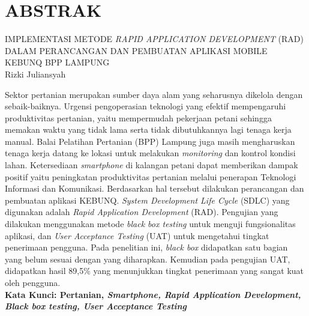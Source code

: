 
\chapter*{ABSTRAK}
\noindent IMPLEMENTASI METODE \textit{RAPID APPLICATION DEVELOPMENT} (RAD) DALAM PERANCANGAN DAN PEMBUATAN APLIKASI MOBILE KEBUNQ BPP LAMPUNG\\
Rizki Juliansyah

\begin{singlespace}
    \begin{justify}
        
    Sektor pertanian merupakan sumber daya alam yang seharusnya dikelola dengan sebaik-baiknya. Urgensi pengoperasian teknologi yang efektif mempengaruhi produktivitas 
    pertanian, yaitu mempermudah pekerjaan petani sehingga memakan waktu yang tidak lama serta tidak dibutuhkannya lagi tenaga kerja manual.
    Balai Pelatihan Pertanian (BPP) Lampung juga masih mengharuskan tenaga kerja datang ke lokasi untuk melakukan \textit{monitoring} 
    dan kontrol kondisi lahan. Ketersediaan \emph{smartphone} di kalangan petani dapat memberikan dampak positif yaitu peningkatan produktivitas pertanian melalui
    penerapan Teknologi Informasi dan Komunikasi. Berdasarkan hal tersebut dilakukan perancangan dan pembuatan aplikasi KEBUNQ. \emph{System Development Life Cycle} (SDLC) yang digunakan adalah \emph{Rapid Application Development}
    (RAD). Pengujian yang dilakukan menggunakan metode \emph{black box testing} untuk menguji fungsionalitas aplikasi, dan \emph{User Acceptance Testing} (UAT) untuk mengetahui tingkat penerimaan pengguna. Pada penelitian ini, \emph{black box} didapatkan satu bagian yang belum sesuai dengan yang diharapkan. Kemudian pada pengujian UAT, didapatkan hasil 89,5\% yang menunjukkan tingkat penerimaan yang sangat kuat oleh pengguna.\\[2cm]
        \textbf{Kata Kunci: Pertanian, \textit{Smartphone, Rapid Application Development, Black box testing, User Acceptance Testing}}
    \end{justify}

\end{singlespace}

\newpage